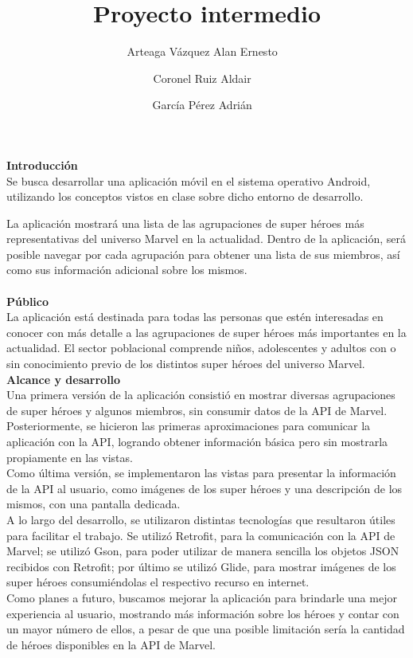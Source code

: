 \documentclass[11pt]{report}
\begin{document}
{}
\title{Proyecto intermedio}
\author{
  Arteaga Vázquez Alan Ernesto \
  \and
  Coronel Ruiz Aldair \
  \and
  García Pérez Adrián \
}\date{}
\maketitle

\textbf{Introducción} \\

Se busca desarrollar una aplicación móvil en el sistema operativo
Android, utilizando los conceptos vistos en clase sobre dicho entorno
de desarrollo.

La aplicación mostrará una lista de las agrupaciones de super
héroes más representativas del universo Marvel en la actualidad.
Dentro de la aplicación, será posible navegar por cada agrupación para obtener
una lista de sus miembros, así como sus información adicional sobre los mismos. \\ \\ 

\textbf{Público} \\

La aplicación está destinada para todas las personas que estén interesadas
en conocer con más detalle a las agrupaciones de super héroes más importantes
en la actualidad. El sector poblacional comprende niños, adolescentes y adultos
con o sin conocimiento previo de los distintos super héroes del universo Marvel. \\

\textbf{Alcance y desarrollo} \\

Una primera versión de la aplicación consistió en mostrar diversas agrupaciones de
super héroes y algunos miembros, sin consumir datos de la API de Marvel. \\

Posteriormente, se hicieron las primeras aproximaciones para comunicar la aplicación 
con la API, logrando obtener información básica pero sin mostrarla propiamente en 
las vistas. \\

Como última versión, se implementaron las vistas para presentar la información de
la API al usuario, como imágenes de los super héroes y una descripción de los
mismos, con una pantalla dedicada. \\

A lo largo del desarrollo, se utilizaron distintas tecnologías que resultaron
útiles para facilitar el trabajo. Se utilizó Retrofit, para la comunicación
con la API de Marvel; se utilizó Gson, para poder utilizar de manera sencilla
los objetos JSON recibidos con Retrofit; por último se utilizó Glide, para
mostrar imágenes de los super héroes consumiéndolas el respectivo recurso 
en internet. \\

Como planes a futuro, buscamos mejorar la aplicación para brindarle una
mejor experiencia al usuario, mostrando más información sobre los héroes
y contar con un mayor número de ellos, a pesar de que una posible 
limitación sería la cantidad de héroes disponibles en la API de Marvel.
\end{document}
